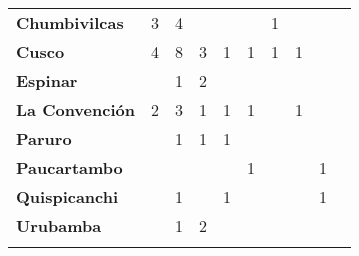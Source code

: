 \begin{tabular}{lccccccccc}
	\textbf{Chumbivilcas}                      			
	&3
	&4											&\cellcolor[HTML]{FCC46C}
	&\cellcolor[HTML]{FCC46C}					&\cellcolor[HTML]{FCC46C}
	&1											&\cellcolor[HTML]{FCC46C}
	&\cellcolor[HTML]{FCC46C}					&\cellcolor[HTML]{FCC46C}\\
	\textbf{Cusco}                            											
	&4
	&8											&3
	&1											&1
	&1											&1
	&\cellcolor[HTML]{FCC46C}					&\cellcolor[HTML]{FCC46C}\\
	\textbf{Espinar}       					             								
	&\cellcolor[HTML]{FCC46C}					&1
	&2											&\cellcolor[HTML]{FCC46C}	
	&\cellcolor[HTML]{FCC46C} 					&\cellcolor[HTML]{FCC46C}
	&\cellcolor[HTML]{FCC46C}					&\cellcolor[HTML]{FCC46C}
	&\cellcolor[HTML]{FCC46C}\\
	\textbf{La Convención}                      					
	&2											&3
	&1 											&1 
	&1											&\cellcolor[HTML]{FCC46C}
	&1											&\cellcolor[HTML]{FCC46C}
	&\cellcolor[HTML]{FCC46C}\\
	\textbf{Paruro}                            					
	&\cellcolor[HTML]{FCC46C} 					&1
	&1											&1
	&\cellcolor[HTML]{FCC46C}					&\cellcolor[HTML]{FCC46C}
	&\cellcolor[HTML]{FCC46C}					&\cellcolor[HTML]{FCC46C}
	&\cellcolor[HTML]{FCC46C}\\
	\textbf{Paucartambo}               		                       						
	&\cellcolor[HTML]{FCC46C}
	&\cellcolor[HTML]{FCC46C}
	&\cellcolor[HTML]{FCC46C}					&\cellcolor[HTML]{FCC46C}
	&1											&\cellcolor[HTML]{FCC46C}
	&\cellcolor[HTML]{FCC46C}					&1
	&\cellcolor[HTML]{FCC46C}\\
	\textbf{Quispicanchi}                                         	                 	
	&\cellcolor[HTML]{FCC46C}
	&1											&\cellcolor[HTML]{FCC46C}
	&1											&\cellcolor[HTML]{FCC46C}
	&\cellcolor[HTML]{FCC46C}					&\cellcolor[HTML]{FCC46C}
	&1											&\cellcolor[HTML]{FCC46C}\\
	\textbf{Urubamba}                                                          			
	&\cellcolor[HTML]{FCC46C}					&1
	&2											&\cellcolor[HTML]{FCC46C}
	&\cellcolor[HTML]{FCC46C}					&\cellcolor[HTML]{FCC46C}
	&\cellcolor[HTML]{FCC46C} 					&\cellcolor[HTML]{FCC46C}
	&\cellcolor[HTML]{FCC46C}\\	
	&\multicolumn{1}{l}{}                       &\multicolumn{1}{l}{}            &\multicolumn{1}{l}{}                         
	&\multicolumn{1}{l}{}                       &\multicolumn{1}{l}{}            &\multicolumn{1}{l}{}                       &\multicolumn{1}{l}{}                       &\multicolumn{1}{l}{}            &\multicolumn{1}{l}{}    
\end{tabular}